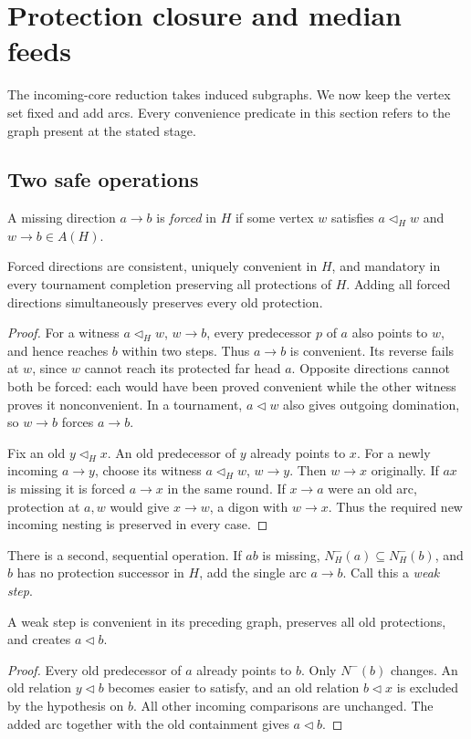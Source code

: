\section{Protection closure and median feeds}\label{sec:paper-closure}
The incoming-core reduction takes induced subgraphs. We now keep the vertex
set fixed and add arcs. Every convenience predicate in this section refers
to the graph present at the stated stage.

\subsection{Two safe operations}
A missing direction $a\to b$ is \emph{forced} in $H$ if some vertex $w$
satisfies $a\triangleleft_H w$ and $w\to b\in A(H)$.

\begin{lemma}\label{lem:paper-forced-step}
Forced directions are consistent, uniquely convenient in $H$, and mandatory
in every tournament completion preserving all protections of $H$.
Adding all forced directions simultaneously preserves every old protection.
\end{lemma}
\begin{proof}
For a witness $a\triangleleft_H w$, $w\to b$, every predecessor $p$ of $a$
also points to $w$, and hence reaches $b$ within two steps. Thus $a\to b$
is convenient. Its reverse fails at $w$, since $w$ cannot reach its protected
far head $a$. Opposite directions cannot both be forced: each would have
been proved convenient while the other witness proves it nonconvenient.
In a tournament, $a\triangleleft w$ also gives outgoing domination, so
$w\to b$ forces $a\to b$.

Fix an old $y\triangleleft_H x$. An old predecessor of $y$ already points
to $x$. For a newly incoming $a\to y$, choose its witness
$a\triangleleft_H w$, $w\to y$. Then $w\to x$ originally. If $ax$ is
missing it is forced $a\to x$ in the same round. If $x\to a$ were an old
arc, protection at $a,w$ would give $x\to w$, a digon with $w\to x$.
Thus the required new incoming nesting is preserved in every case.
\end{proof}

There is a second, sequential operation. If $ab$ is missing,
$N_H^-(a)\subseteq N_H^-(b)$, and $b$ has no protection successor in $H$,
add the single arc $a\to b$. Call this a \emph{weak step}.

\begin{lemma}\label{lem:paper-weak-step}
A weak step is convenient in its preceding graph, preserves all old
protections, and creates $a\triangleleft b$.
\end{lemma}
\begin{proof}
Every old predecessor of $a$ already points to $b$. Only $N^-(b)$ changes.
An old relation $y\triangleleft b$ becomes easier to satisfy, and an old
relation $b\triangleleft x$ is excluded by the hypothesis on $b$.
All other incoming comparisons are unchanged. The added arc together with
the old containment gives $a\triangleleft b$.
\end{proof}

